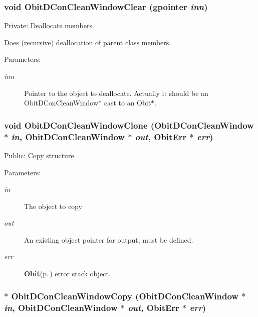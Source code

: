 \subsubsection{\setlength{\rightskip}{0pt plus 5cm}void Obit\-DCon\-Clean\-Window\-Clear (gpointer {\em inn})}\label{ObitDConCleanWindow_8c_a5}


Private: Deallocate members. 

Does (recursive) deallocation of parent class members. \begin{Desc}
\item[Parameters:]
\begin{description}
\item[{\em inn}]Pointer to the object to deallocate. Actually it should be an Obit\-DCon\-Clean\-Window$\ast$ cast to an Obit$\ast$. \end{description}
\end{Desc}
\subsubsection{\setlength{\rightskip}{0pt plus 5cm}void Obit\-DCon\-Clean\-Window\-Clone ({\bf Obit\-DCon\-Clean\-Window} $\ast$ {\em in}, {\bf Obit\-DCon\-Clean\-Window} $\ast$ {\em out}, {\bf Obit\-Err} $\ast$ {\em err})}\label{ObitDConCleanWindow_8c_a14}


Public: Copy structure. 

\begin{Desc}
\item[Parameters:]
\begin{description}
\item[{\em in}]The object to copy \item[{\em out}]An existing object pointer for output, must be defined. \item[{\em err}]{\bf Obit}{\rm (p.\,\pageref{structObit})} error stack object. \end{description}
\end{Desc}
\subsubsection{$\ast$ Obit\-DCon\-Clean\-Window\-Copy ({\bf Obit\-DCon\-Clean\-Window} $\ast$ {\em in}, {\bf Obit\-DCon\-Clean\-Window} $\ast$ {\em out}, {\bf Obit\-Err} $\ast$ {\em err})}\label{ObitDConCleanWindow_8c_a13}


